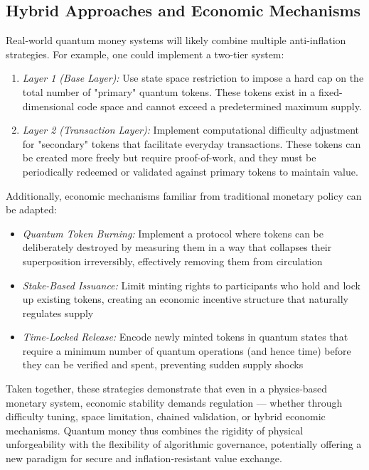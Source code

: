 \documentclass[a4paper,10.5pt,twoside]{article}
\begin{document}
\subsection{Hybrid Approaches and Economic Mechanisms}\label{s:3.4}
Real-world quantum money systems will likely combine multiple anti-inflation strategies. For example, one could implement a two-tier system:

\begin{enumerate}
\item \textit{Layer 1 (Base Layer):} Use state space restriction to impose a hard cap on the total number of "primary" quantum tokens. These tokens exist in a fixed-dimensional code space and cannot exceed a predetermined maximum supply.

\item \textit{Layer 2 (Transaction Layer):} Implement computational difficulty adjustment for "secondary" tokens that facilitate everyday transactions. These tokens can be created more freely but require proof-of-work, and they must be periodically redeemed or validated against primary tokens to maintain value.
\end{enumerate}

Additionally, economic mechanisms familiar from traditional monetary policy can be adapted:
\begin{itemize}
\item \textit{Quantum Token Burning:} Implement a protocol where tokens can be deliberately destroyed by measuring them in a way that collapses their superposition irreversibly, effectively removing them from circulation
\item \textit{Stake-Based Issuance:} Limit minting rights to participants who hold and lock up existing tokens, creating an economic incentive structure that naturally regulates supply
\item \textit{Time-Locked Release:} Encode newly minted tokens in quantum states that require a minimum number of quantum operations (and hence time) before they can be verified and spent, preventing sudden supply shocks
\end{itemize}

Taken together, these strategies demonstrate that even in a physics-based monetary system, economic stability demands regulation — whether through difficulty tuning, space limitation, chained validation, or hybrid economic mechanisms. Quantum money thus combines the rigidity of physical unforgeability with the flexibility of algorithmic governance, potentially offering a new paradigm for secure and inflation-resistant value exchange.
\end{document}
